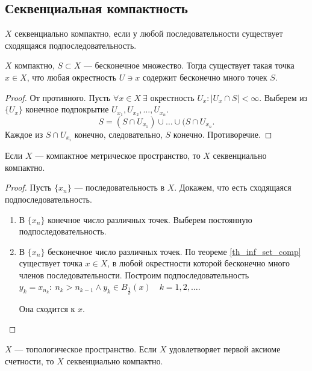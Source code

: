 \documentclass[11pt]{book}
\theoremstyle{definition}
\theoremstyle{plain}
\theoremstyle{plain}
\theoremstyle{definition}
\theoremstyle{remark}
\begin{document}
\subsection{Секвенциальная компактность}
\begin{defn}
    $ X$ секвенциально  компактно, если у любой последовательности существует сходящаяся подпоследовательность.
\end{defn}
\begin{thm}\label{th_inf_set_comp}
    $ X$ компактно,  $ S \subset X$ --- бесконечное множество. Тогда существует такая точка $ x \in X$, что любая окрестность $ U \ni x$  содержит бесконечно много точек  $ S$.
\end{thm}
\begin{proof}
    От противного. Пусть $ \forall x \in  X ~ \exists \text{ окрестность } U_x: |U_x \cap S| < \infty$.
    Выберем из $ \{U_x\}$ конечное подпокрытие $ U_{x_1}, U_{x_2}, \ldots , U_{x_{n}}$.
    \[
	S = (S \cap U_{x_1}) \cup \ldots \cup (S \cap U_{x_{n}}
    .\]
    Каждое из $ S \cap U_{x_{i}}$ конечно, следовательно, $ S$ конечно.  Противоречие.
\end{proof}
\begin{thm}\label{th_comp_to_sec_comp}
    Если $ X$ --- компактное метрическое пространство, то $ X$ секвенциально компактно.
\end{thm}
\begin{proof}
    Пусть $ \{x_{n}\}$ --- последовательность в $ X$. Докажем, что есть сходящаяся подпоследовательность.
    \begin{enumerate}
	\item В $ \{x_n\}$ конечное число различных точек. Выберем постоянную подпоследовательность.
	\item В $ \{x_{n}\}$ бесконечное число различных точек. По теореме \ref{th_inf_set_comp} существует точка $ x \in X$, в любой окрестности которой бесконечно много членов последовательности.
	    Построим подпоследовательность $ y_k = x_{n_k}: ~ n_k > n_{k-1} \wedge y_k \in B_{\frac{1}{k}}(x) \quad k = 1, 2, \ldots $.

	    Она сходится к $ x$.
    \end{enumerate}
\end{proof}
\begin{thm}
    $ X$ ---  топологическое пространство. Если $ X$ удовлетворяет первой аксиоме счетности,  то $ X$ секвенциально компактно.
\end{thm}
\end{document}
